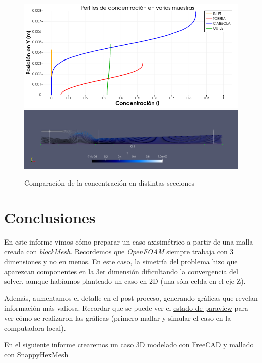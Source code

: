 \documentclass{article}
\begin{document}
\begin{figure}[h!]
	\centering
	\includegraphics[width=1\textwidth]{Figuras/08_COMP_CONCEN.png}
	\includegraphics[width=1\textwidth]{Figuras/08_CONCENC_STREAM.png}
	\caption{Comparación de la concentración en distintas secciones}
	\label{fig:comp_seccion_con}
\end{figure}




\section{Conclusiones}
En este informe vimos cómo preparar un caso axisimétrico a partir de una malla creada con \textit{blockMesh}. Recordemos que \textit{OpenFOAM} siempre trabaja con 3 dimensiones y no en menos. En este caso, la simetría del problema hizo que aparezcan componentes en la 3er dimensión dificultando la convergencia del solver, aunque habíamos planteado un caso en 2D (una sóla celda en el eje Z).

Además, aumentamos el detalle en el post-proceso, generando gráficas que revelan información más valiosa. Recordar que se puede ver el \href{https://github.com/guillerolle/casos_cfd/02/RTD/RTD.pvsm}{estado de paraview} para ver cómo se realizaron las gráficas (primero mallar y simular el caso en la computadora local).

En el siguiente informe crearemos un caso 3D modelado con \href{https://www.freecadweb.org/}{FreeCAD} y mallado con \href{https://cfd.direct/openfoam/user-guide/v6-snappyhexmesh/}{SnappyHexMesh}
\end{document}
